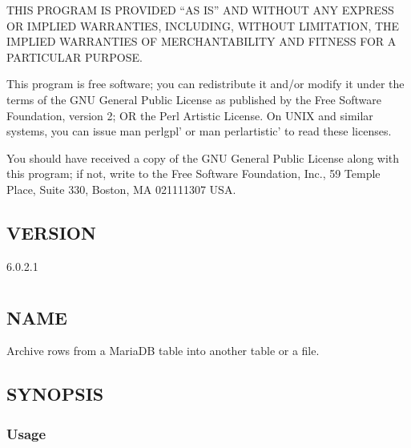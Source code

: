 \documentclass[letterpaper,10pt,english]{sphinxmanual}
\begin{document}
THIS PROGRAM IS PROVIDED “AS IS” AND WITHOUT ANY EXPRESS OR IMPLIED
WARRANTIES, INCLUDING, WITHOUT LIMITATION, THE IMPLIED WARRANTIES OF
MERCHANTABILITY AND FITNESS FOR A PARTICULAR PURPOSE.

This program is free software; you can redistribute it and/or modify it under
the terms of the GNU General Public License as published by the Free Software
Foundation, version 2; OR the Perl Artistic License.  On UNIX and similar
systems, you can issue \textasciigrave{}man perlgpl’ or \textasciigrave{}man perlartistic’ to read these
licenses.

You should have received a copy of the GNU General Public License along with
this program; if not, write to the Free Software Foundation, Inc., 59 Temple
Place, Suite 330, Boston, MA  02111\sphinxhyphen{}1307  USA.


\section{VERSION}
\label{\detokenize{mariadb-align-output:version}}
 6.0.2.1


\chapter{}
\label{\detokenize{mariadb-archiver:mariadb-archiver}}\label{\detokenize{mariadb-archiver::doc}}

\section{NAME}
\label{\detokenize{mariadb-archiver:name}}
 \sphinxhyphen{} Archive rows from a MariaDB table into another table or a file.


\section{SYNOPSIS}
\label{\detokenize{mariadb-archiver:synopsis}}

\subsection{Usage}
\label{\detokenize{mariadb-archiver:usage}}
\begin{sphinxVerbatim}[commandchars=\\\{\}]
 \PYG{p}{[}\PYG{p}{]}    
\end{sphinxVerbatim}
\end{document}
